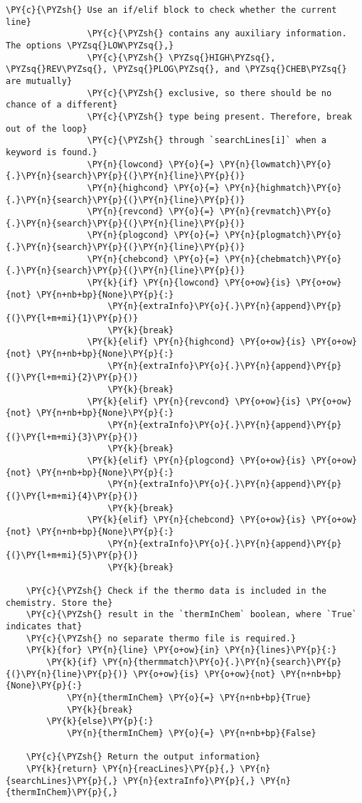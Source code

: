 \begin{Verbatim}[commandchars=\\\{\}]
                \PY{c}{\PYZsh{} Use an if/elif block to check whether the current line}
                \PY{c}{\PYZsh{} contains any auxiliary information. The options \PYZsq{}LOW\PYZsq{},}
                \PY{c}{\PYZsh{} \PYZsq{}HIGH\PYZsq{}, \PYZsq{}REV\PYZsq{}, \PYZsq{}PLOG\PYZsq{}, and \PYZsq{}CHEB\PYZsq{} are mutually}
                \PY{c}{\PYZsh{} exclusive, so there should be no chance of a different}
                \PY{c}{\PYZsh{} type being present. Therefore, break out of the loop}
                \PY{c}{\PYZsh{} through `searchLines[i]` when a keyword is found.}
                \PY{n}{lowcond} \PY{o}{=} \PY{n}{lowmatch}\PY{o}{.}\PY{n}{search}\PY{p}{(}\PY{n}{line}\PY{p}{)}
                \PY{n}{highcond} \PY{o}{=} \PY{n}{highmatch}\PY{o}{.}\PY{n}{search}\PY{p}{(}\PY{n}{line}\PY{p}{)}
                \PY{n}{revcond} \PY{o}{=} \PY{n}{revmatch}\PY{o}{.}\PY{n}{search}\PY{p}{(}\PY{n}{line}\PY{p}{)}
                \PY{n}{plogcond} \PY{o}{=} \PY{n}{plogmatch}\PY{o}{.}\PY{n}{search}\PY{p}{(}\PY{n}{line}\PY{p}{)}
                \PY{n}{chebcond} \PY{o}{=} \PY{n}{chebmatch}\PY{o}{.}\PY{n}{search}\PY{p}{(}\PY{n}{line}\PY{p}{)}
                \PY{k}{if} \PY{n}{lowcond} \PY{o+ow}{is} \PY{o+ow}{not} \PY{n+nb+bp}{None}\PY{p}{:}
                    \PY{n}{extraInfo}\PY{o}{.}\PY{n}{append}\PY{p}{(}\PY{l+m+mi}{1}\PY{p}{)}
                    \PY{k}{break}
                \PY{k}{elif} \PY{n}{highcond} \PY{o+ow}{is} \PY{o+ow}{not} \PY{n+nb+bp}{None}\PY{p}{:}
                    \PY{n}{extraInfo}\PY{o}{.}\PY{n}{append}\PY{p}{(}\PY{l+m+mi}{2}\PY{p}{)}
                    \PY{k}{break}
                \PY{k}{elif} \PY{n}{revcond} \PY{o+ow}{is} \PY{o+ow}{not} \PY{n+nb+bp}{None}\PY{p}{:}
                    \PY{n}{extraInfo}\PY{o}{.}\PY{n}{append}\PY{p}{(}\PY{l+m+mi}{3}\PY{p}{)}
                    \PY{k}{break}
                \PY{k}{elif} \PY{n}{plogcond} \PY{o+ow}{is} \PY{o+ow}{not} \PY{n+nb+bp}{None}\PY{p}{:}
                    \PY{n}{extraInfo}\PY{o}{.}\PY{n}{append}\PY{p}{(}\PY{l+m+mi}{4}\PY{p}{)}
                    \PY{k}{break}
                \PY{k}{elif} \PY{n}{chebcond} \PY{o+ow}{is} \PY{o+ow}{not} \PY{n+nb+bp}{None}\PY{p}{:}
                    \PY{n}{extraInfo}\PY{o}{.}\PY{n}{append}\PY{p}{(}\PY{l+m+mi}{5}\PY{p}{)}
                    \PY{k}{break}

    \PY{c}{\PYZsh{} Check if the thermo data is included in the chemistry. Store the}
    \PY{c}{\PYZsh{} result in the `thermInChem` boolean, where `True` indicates that}
    \PY{c}{\PYZsh{} no separate thermo file is required.}
    \PY{k}{for} \PY{n}{line} \PY{o+ow}{in} \PY{n}{lines}\PY{p}{:}
        \PY{k}{if} \PY{n}{thermmatch}\PY{o}{.}\PY{n}{search}\PY{p}{(}\PY{n}{line}\PY{p}{)} \PY{o+ow}{is} \PY{o+ow}{not} \PY{n+nb+bp}{None}\PY{p}{:}
            \PY{n}{thermInChem} \PY{o}{=} \PY{n+nb+bp}{True}
            \PY{k}{break}
        \PY{k}{else}\PY{p}{:}
            \PY{n}{thermInChem} \PY{o}{=} \PY{n+nb+bp}{False}

    \PY{c}{\PYZsh{} Return the output information}
    \PY{k}{return} \PY{n}{reacLines}\PY{p}{,} \PY{n}{searchLines}\PY{p}{,} \PY{n}{extraInfo}\PY{p}{,} \PY{n}{thermInChem}\PY{p}{,}
\end{Verbatim}
